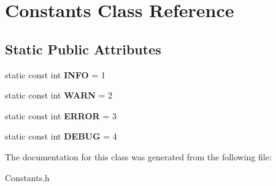 \hypertarget{classConstants}{\section{Constants Class Reference}
\label{classConstants}
}
\subsection*{Static Public Attributes}
\begin{DoxyCompactItemize}
\item 
\hypertarget{classConstants_aec8fd3f3276348ad77b6d126827dd930}{static const int {\bfseries I\-N\-F\-O} = 1}\label{classConstants_aec8fd3f3276348ad77b6d126827dd930}

\item 
\hypertarget{classConstants_ab9873ae6277f2fe9dbc7a786ede6e36a}{static const int {\bfseries W\-A\-R\-N} = 2}\label{classConstants_ab9873ae6277f2fe9dbc7a786ede6e36a}

\item 
\hypertarget{classConstants_a9b92b4aa11dac94d98d5a67e0cfa29a6}{static const int {\bfseries E\-R\-R\-O\-R} = 3}\label{classConstants_a9b92b4aa11dac94d98d5a67e0cfa29a6}

\item 
\hypertarget{classConstants_ae26c6ab4597084273bd59f5c0bfe8b1b}{static const int {\bfseries D\-E\-B\-U\-G} = 4}\label{classConstants_ae26c6ab4597084273bd59f5c0bfe8b1b}

\end{DoxyCompactItemize}


The documentation for this class was generated from the following file\-:\begin{DoxyCompactItemize}
\item 
Constants.\-h\end{DoxyCompactItemize}

